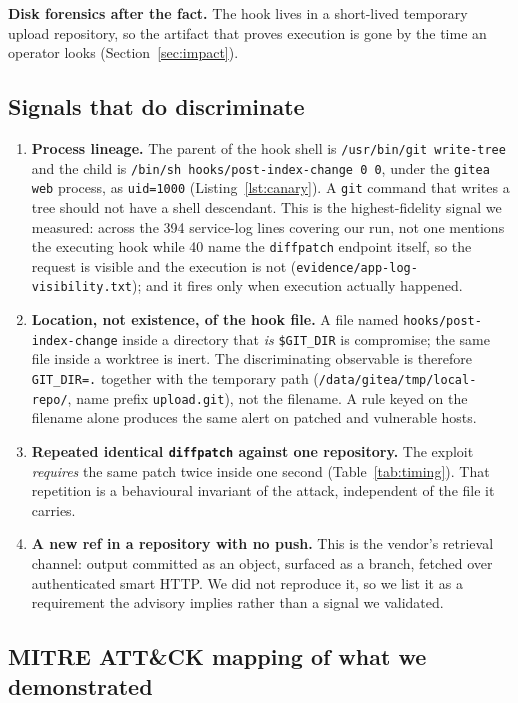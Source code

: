 \textbf{Disk forensics after the fact.} The hook lives in a short-lived
temporary upload repository, so the artifact that proves execution is gone by
the time an operator looks (Section~\ref{sec:impact}).

\subsection{Signals that do discriminate}

\begin{enumerate}
\item \textbf{Process lineage.} The parent of the hook shell is
\texttt{/usr/bin/git write-tree} and the child is \texttt{/bin/sh
hooks/post-index-change 0 0}, under the \texttt{gitea web} process, as
\texttt{uid=1000} (Listing~\ref{lst:canary}). A \texttt{git} command that writes
a tree should not have a shell descendant. This is the highest-fidelity signal we
measured: across the 394 service-log lines covering our run, not one mentions the
executing hook while 40 name the \texttt{diffpatch} endpoint itself, so the
request is visible and the execution is not
(\texttt{evidence/app-log-visibility.txt}); and it fires only when execution
actually happened.
\item \textbf{Location, not existence, of the hook file.} A file named
\texttt{hooks/post-index-change} inside a directory that \emph{is}
\texttt{\$GIT\_DIR} is compromise; the same file inside a worktree is inert. The
discriminating observable is therefore \texttt{GIT\_DIR=.} together with the
temporary path (\texttt{/data/gitea/tmp/local-repo/}, name prefix
\texttt{upload.git}), not the filename. A rule keyed on the filename alone
produces the same alert on patched and vulnerable hosts.
\item \textbf{Repeated identical \texttt{diffpatch} against one repository.} The
exploit \emph{requires} the same patch twice inside one second
(Table~\ref{tab:timing}). That repetition is a behavioural invariant of the
attack, independent of the file it carries.
\item \textbf{A new ref in a repository with no push.} This is the vendor's
retrieval channel: output committed as an object, surfaced as a branch, fetched
over authenticated smart HTTP. We did not reproduce it, so we list it as a
requirement the advisory implies rather than a signal we validated.
\end{enumerate}

\subsection{MITRE ATT\&CK mapping of what we demonstrated}

